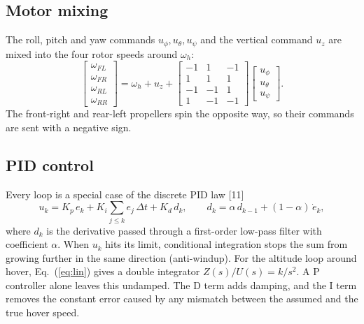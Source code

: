 \subsection{Motor mixing}
The roll, pitch and yaw commands $u_\phi, u_\theta, u_\psi$ and the vertical command $u_z$ are mixed into the four rotor speeds around $\omega_h$:
\begin{equation}
\begin{bmatrix}\omega_{FL}\\ \omega_{FR}\\ \omega_{RL}\\ \omega_{RR}\end{bmatrix} = \omega_h + u_z +
\begin{bmatrix} -1 & 1 & -1\\ 1 & 1 & 1\\ -1 & -1 & 1\\ 1 & -1 & -1 \end{bmatrix}
\begin{bmatrix}u_\phi\\ u_\theta\\ u_\psi\end{bmatrix}.
\label{eq:mix}
\end{equation}
The front-right and rear-left propellers spin the opposite way, so their commands are sent with a negative sign.

\subsection{PID control}
Every loop is a special case of the discrete PID law [11]
\begin{equation}
u_k = K_p\,e_k + K_i \sum_{j\le k} e_j\,\Delta t + K_d\,d_k, \qquad d_k = \alpha\, d_{k-1} + (1-\alpha)\,\dot e_k,
\label{eq:pid}
\end{equation}
where $d_k$ is the derivative passed through a first-order low-pass filter with coefficient $\alpha$. When $u_k$ hits its limit, conditional integration stops the sum from growing further in the same direction (anti-windup). For the altitude loop around hover, Eq.~(\ref{eq:lin}) gives a double integrator $Z(s)/U(s) = k/s^2$. A P controller alone leaves this undamped. The D term adds damping, and the I term removes the constant error caused by any mismatch between the assumed and the true hover speed.

